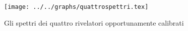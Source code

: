 \begin{figure}[h] \centering\texttt{[image: ../../graphs/quattrospettri.tex]}\caption{Gli spettri dei quattro rivelatori opportunamente calibrati }\label{gr:quattrospettri} \end{figure}

